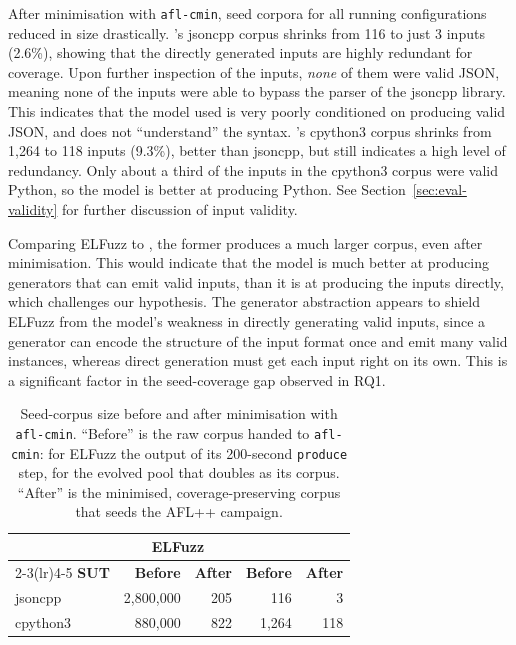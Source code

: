 After minimisation with \texttt{afl-cmin}, seed corpora for all running configurations reduced in size drastically. \toolname{}'s jsoncpp corpus shrinks from 116 to just 3 inputs (2.6\%), showing that the directly generated inputs are highly redundant for coverage. Upon further inspection of the inputs, \textit{none} of them were valid JSON, meaning none of the inputs were able to bypass the parser of the jsoncpp library. This indicates that the model used is very poorly conditioned on producing valid JSON, and does not ``understand'' the syntax. \toolname{}'s cpython3 corpus shrinks from 1,264 to 118 inputs (9.3\%), better than jsoncpp, but still indicates a high level of redundancy. Only about a third of the inputs in the cpython3 corpus were valid Python, so the model is better at producing Python. See Section~\ref{sec:eval-validity} for further discussion of input validity.

Comparing ELFuzz to \toolname{}, the former produces a much larger corpus, even after minimisation. This would indicate that the model is much better at producing generators that can emit valid inputs, than it is at producing the inputs directly, which challenges our hypothesis. The generator abstraction appears to shield ELFuzz from the model's weakness in directly generating valid inputs, since a generator can encode the structure of the input format once and emit many valid instances, whereas direct generation must get each input right on its own. This is a significant factor in the seed-coverage gap observed in RQ1.

\begin{table}[h]
    \centering
    \begin{tabular}{lrrrr}
        \toprule
        & \multicolumn{2}{c}{\textbf{ELFuzz}} & \multicolumn{2}{c}{\textbf{\toolname{}}} \\
        \cmidrule(lr){2-3}\cmidrule(lr){4-5}
        \textbf{SUT} & \textbf{Before} & \textbf{After} & \textbf{Before} & \textbf{After} \\
        \midrule
        jsoncpp  & 2{,}800{,}000 & 205 & 116     & 3   \\
        cpython3 & 880{,}000     & 822 & 1{,}264 & 118 \\
        \bottomrule
    \end{tabular}
    \caption{Seed-corpus size before and after minimisation with \texttt{afl-cmin}. ``Before'' is the raw corpus handed to \texttt{afl-cmin}: for ELFuzz the output of its 200-second \texttt{produce} step, for \toolname{} the evolved pool that doubles as its corpus. ``After'' is the minimised, coverage-preserving corpus that seeds the AFL++ campaign.}
    \label{tab:seedcount}
\end{table}

